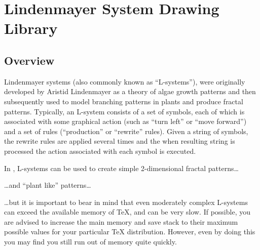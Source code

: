 %
%
%


\section{Lindenmayer System Drawing Library}

\subsection{Overview}

Lindenmayer systems (also commonly known as ``L-systems''), were originally
developed by Aristid Lindenmayer as a theory of algae growth patterns and then
subsequently used to model branching patterns in plants and produce fractal
patterns. Typically, an L-system consists of a set of symbols, each of which is
associated with some graphical action (such as ``turn left'' or ``move
forward'') and a set of rules (``production'' or ``rewrite'' rules). Given a
string of symbols, the rewrite rules are applied several times and the when
resulting string is processed the action associated with each symbol is
executed.
%
\begin{codeexample}
    \usetikzlibrary{lindenmayersystems}
\end{codeexample}

In \pgfname, L-systems can be used to create simple 2-dimensional fractal
patterns\ldots
%
\begin{codeexample}[pre={\expandafter\let\csname pgf@lsystem@Koch curve\endcsname=\relax}]
\end{codeexample}
%
\noindent\ldots and ``plant like'' patterns\ldots
%
\begin{codeexample}[]
\end{codeexample}
%
\noindent \ldots but it is important to bear in mind that even moderately
complex L-systems can exceed the available memory of \TeX, and can be very
slow. If possible, you are advised to increase the main memory and save stack
to their maximum possible values for your particular \TeX{} distribution.
However, even by doing this you may find you still run out of memory quite
quickly.

